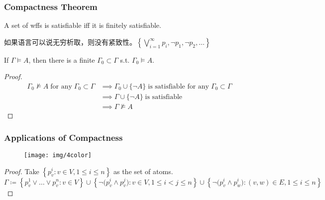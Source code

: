 \documentclass[UTF8,11pt,colorlinks,compress,openany]{beamer}%
\begin{document}
\begin{frame}\frametitle{Compactness Theorem}
\setlength\abovedisplayskip{0pt}
\setlength\belowdisplayskip{0pt}
	\begin{theorem}
		A set of wffs is satisfiable iff it is finitely satisfiable.
	\end{theorem}
	\begin{block}{}
	如果语言可以说无穷析取，则没有紧致性。$\left\{\bigvee\limits_{i=1}^\infty p_i,\neg p_1,\neg p_2,\dots\right\}$
	\end{block}
	\begin{corollary}
		If $\Gamma\vDash A$, then there is a finite $\Gamma_0\subset\Gamma$ s.t. $\Gamma_0\vDash A$.
	\end{corollary}
	\begin{proof}
		\begin{align*}
		\Gamma_0\nvDash A\;\text{for any}\;\Gamma_0\subset\Gamma&\implies\Gamma_0\cup\{\neg A\}\;\text{is satisfiable for any}\;\Gamma_0\subset\Gamma\\
		&\implies\Gamma\cup\{\neg A\}\;\text{is satisfiable}\\
		&\implies\Gamma\nvDash A
		\end{align*}
	\end{proof}
\end{frame}

\begin{frame}\frametitle{Applications of Compactness}
	\begin{figure}
	\texttt{[image: img/4color]}
	\end{figure}
	\begin{center}
	\end{center}
\begin{proof}
Take $\left\{p_v^i: v\in V, 1\leq i\leq n\right\}$ as the set of atoms.\\
$\Gamma\coloneqq \left\{p_v^1\vee\dots\vee p_v^n: v\in V\right\}\cup\left\{\neg\big(p_v^i\wedge p_v^j\big): v\in V, 1\leq i<j\leq n\right\}\cup\left\{\neg\big(p_v^i\wedge p_w^i\big): (v,w)\in E, 1\leq i\leq n\right\}$
\end{proof}
\end{frame}
\end{document}
